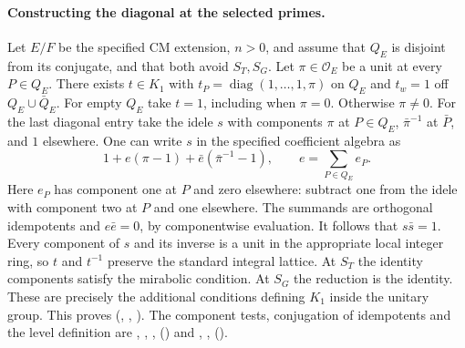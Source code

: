 \paragraph{Constructing the diagonal at the selected primes.}
Let $E/F$ be the specified CM extension, $n>0$, and assume that $Q_E$
is disjoint from its conjugate, and that both avoid $S_T,S_G$. Let
$\pi\in\mathcal O_E$ be a unit at every $P\in Q_E$. There exists
$t\in K_1$ with $t_P=\operatorname{diag}(1,\ldots,1,\pi)$ on $Q_E$
and $t_w=1$ off $Q_E\cup\bar Q_E$. For empty $Q_E$ take $t=1$, including
when $\pi=0$. Otherwise $\pi\ne0$. For the last diagonal entry take the
idele $s$ with components $\pi$ at $P\in Q_E$, $\bar\pi^{-1}$ at
$\bar P$, and $1$ elsewhere. One can write $s$ in the specified coefficient
algebra as
\[
 1+e(\pi-1)+\bar e(\bar\pi^{-1}-1),
 \qquad e=\sum_{P\in Q_E} e_P .
\]
Here $e_P$ has component one at $P$ and zero elsewhere: subtract one from
the idele with component two at $P$ and one elsewhere. The summands are
orthogonal idempotents and $e\bar e=0$, by componentwise evaluation.
It follows that $s\bar s=1$. Every component of $s$ and its inverse
is a unit in the appropriate local integer ring, so $t$ and $t^{-1}$
preserve the standard integral lattice. At $S_T$ the identity components
satisfy the mirabolic condition. At $S_G$ the reduction is the identity.
These are precisely the additional conditions defining $K_1$ inside the
unitary group. This proves 
(,
, ).
The component tests, conjugation of idempotents and the level definition
are , , , 
() and , ,
 ().

